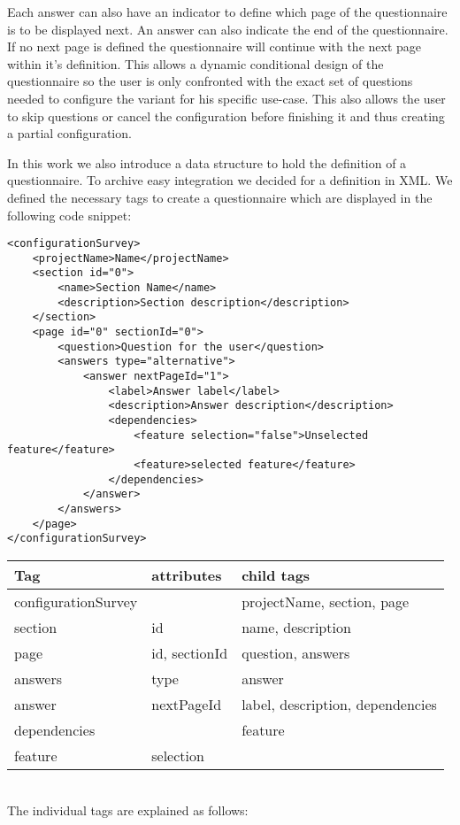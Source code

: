 Each answer can also have an indicator to define which page of the questionnaire is to be displayed next. An answer can also indicate the end of the questionnaire. If no next page is defined the questionnaire will continue with the next page within it's definition. This allows a dynamic conditional design of the questionnaire so the user is only confronted with the exact set of questions needed to configure the variant for his specific use-case. This also allows the user to skip questions or cancel the configuration before finishing it and thus creating a partial configuration.

In this work we also introduce a data structure to hold the definition of a questionnaire. To archive easy integration we decided for a definition in XML. We defined the necessary tags to create a questionnaire which are displayed in the following code snippet:

\begin{lstlisting}
<configurationSurvey>
	<projectName>Name</projectName>
	<section id="0">
		<name>Section Name</name>
		<description>Section description</description>
	</section>
	<page id="0" sectionId="0">
		<question>Question for the user</question>
		<answers type="alternative">
			<answer nextPageId="1">
				<label>Answer label</label>
				<description>Answer description</description>
				<dependencies>
					<feature selection="false">Unselected feature</feature>
					<feature>selected feature</feature>
				</dependencies>
			</answer>
		</answers>
	</page>
</configurationSurvey>
\end{lstlisting}

\begin{tabular}{ l | l | l }
\textbf{Tag} & \textbf{attributes} & \textbf{child tags}\\
\hline
\hline
configurationSurvey & & projectName, section, page\\
\hline
section & id & name, description\\
\hline
page & id, sectionId & question, answers\\
\hline
answers & type & answer\\
\hline
answer & nextPageId & label, description, dependencies\\
\hline
dependencies & & feature\\
\hline
feature & selection & \\
\end{tabular}\\


The individual tags are explained as follows:

